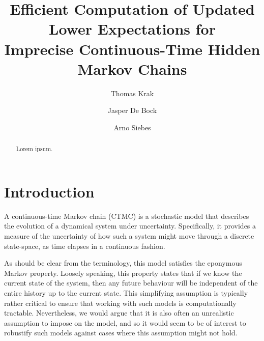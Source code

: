 \documentclass[twoside,11pt]{article}
\title{Efficient Computation of Updated Lower Expectations for\\ Imprecise Continuous-Time Hidden Markov Chains}
\author{Thomas Krak \and Jasper De Bock \and Arno Siebes}
\begin{document}


\date{}
\maketitle



\begin{abstract}
Lorem ipsum.
\end{abstract}

\section{Introduction}\label{sec:introduction}

A continuous-time Markov chain (CTMC) is a stochastic model that describes the evolution of a dynamical system under uncertainty. Specifically, it provides a measure of the uncertainty of how such a system might move through a discrete state-space, as time elapses in a continuous fashion.

As should be clear from the terminology, this model satisfies the eponymous Markov property. Loosely speaking, this property states that if we know the current state of the system, then any future behaviour will be independent of the entire history up to the current state. This simplifying assumption is typically rather critical to ensure that working with such models is computationally tractable. Nevertheless, we would argue that it is also often an unrealistic assumption to impose on the model, and so it would seem to be of interest to robustify such models against cases where this assumption might not hold.
\end{document}
